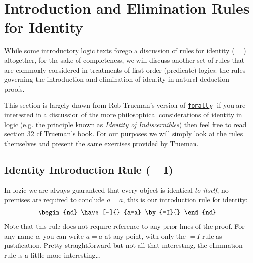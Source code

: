 \section{Introduction and Elimination Rules for Identity}
While some introductory logic texts forego a discussion of rules for identity ($=$) altogether, for the sake of completeness, we will discuss another set of rules that are commonly considered in treatments of first-order (predicate) logics: the rules governing the introduction and elimination of identity in natural deduction proofs.

This section is largely drawn from Rob Trueman's version of \href{https://www.rtrueman.com/forallx.html}{\texttt{forall}$\chi$}\cite{trueman2023forall}, if you are interested in a discussion of the more philosophical considerations of identity in logic (e.g. the principle known as \textit{Identity of Indiscernibles}) then feel free to read section 32 of Trueman's book. For our purposes we will simply look at the rules themselves and present the same exercises provided by Trueman.
\subsection{Identity Introduction Rule ($=$I)}
In logic we are always guaranteed that every object is identical \textit{to itself}, no premises are required to conclude $a=a$, this is our introduction rule for identity:
\begin{equation}
    \begin{nd}
        \have[~]{} {a=a} \by{=I}{}
    \end{nd} \nonumber
\end{equation}
Note that this rule does not require reference to any prior lines of the proof. For any name $a$, you can write $a = a$ at any point, with only the $=I$ rule as justification. Pretty straightforward but not all that interesting, the elimination rule is a little more interesting...


